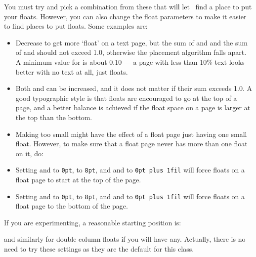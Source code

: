  You must try and pick a combination from these that will let \ltx\ find
a place to put your floats. However, you can 
also change the float parameters to make it easier to find places
to put floats. Some examples are:
\begin{itemize}
\item Decrease \cmd{\textfraction} to get more `float' on a text page, 
  but the sum of \cmd{\textfraction} and \cmd{\topfraction} and the sum 
  of \cmd{\textfraction} and \cmd{\bottomfraction} should not exceed 1.0, 
  otherwise the placement algorithm falls apart. A minimum value for 
  \cmd{\textfraction} is about 0.10 --- a page with less than 10\% text 
  looks better with no text at all, just floats.

\item Both \cmd{\topfraction} and \cmd{\bottomfraction} can be increased, 
  and it does not matter if their sum exceeds 1.0. A good typographic 
  style is that floats are encouraged to go at the top of a page, and 
  a better balance is achieved if the float space on a page is larger
  at the top than the bottom.

\item Making \cmd{\floatpagefraction} too small might have the effect of a
 float page just having one small float. However, to make sure that a float
 page never has more than one float on it, do: 
\begin{lcode}
\renewcommand{\floatpagefraction}{0.01}
\setlength{\@fpsep}{\textheight}
\end{lcode}

\item Setting \lnc{\@fptop} and \lnc{\@dblftop} to \texttt{0pt}, 
      \lnc{\@fpsep} to \texttt{8pt}, 
       and \lnc{\@fpbot} and \lnc{\@dblfpbot} to \texttt{0pt plus 1fil} 
       will force floats on 
       a float page to start at the top of the page.


\item Setting \lnc{\@fpbot} and \lnc{\@dblfpbot} to \texttt{0pt}, 
      \lnc{\@fpsep} to \texttt{8pt},
       and \lnc{\@fptop} and \lnc{\@dblfptop} to \texttt{0pt plus 1fil} 
       will force floats on 
       a float page to the bottom of the page.
\end{itemize}

     If you are experimenting, a reasonable starting position is:
\begin{lcode}
\setcounter{topnumber}{3}
\setcounter{bottomnumber}{2}
\setcounter{totalnumber}{4}
\renewcommand{\topfraction}{0.85}
\renewcommand{\bottomfraction}{0.5}
\renewcommand{\textfraction}{0.15}
\renewcommand{\floatpagefraction}{0.7}
\end{lcode}
and similarly for double column floats if you will 
have any. Actually, there is no need
to try these settings as they are the default for this class.


